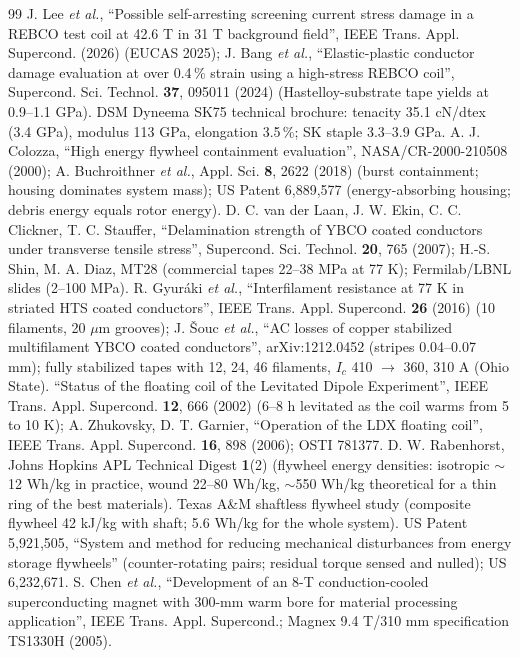 \begin{thebibliography}{99}
 J. Lee \emph{et al.}, ``Possible self-arresting screening current stress damage in a REBCO test coil at 42.6 T in 31 T background field'', IEEE Trans. Appl. Supercond. (2026) (EUCAS 2025); J. Bang \emph{et al.}, ``Elastic-plastic conductor damage evaluation at over 0.4\,\% strain using a high-stress REBCO coil'', Supercond. Sci. Technol. \textbf{37}, 095011 (2024) (Hastelloy-substrate tape yields at 0.9--1.1 GPa).
 DSM Dyneema SK75 technical brochure: tenacity 35.1 cN/dtex (3.4 GPa), modulus 113 GPa, elongation 3.5\,\%; SK staple 3.3--3.9 GPa.
 A. J. Colozza, ``High energy flywheel containment evaluation'', NASA/CR-2000-210508 (2000); A. Buchroithner \emph{et al.}, Appl. Sci. \textbf{8}, 2622 (2018) (burst containment; housing dominates system mass); US Patent 6,889,577 (energy-absorbing housing; debris energy equals rotor energy).
 D. C. van der Laan, J. W. Ekin, C. C. Clickner, T. C. Stauffer, ``Delamination strength of YBCO coated conductors under transverse tensile stress'', Supercond. Sci. Technol. \textbf{20}, 765 (2007); H.-S. Shin, M. A. Diaz, MT28 (commercial tapes 22--38 MPa at 77 K); Fermilab/LBNL slides (2--100 MPa).
 R. Gyur\'aki \emph{et al.}, ``Interfilament resistance at 77 K in striated HTS coated conductors'', IEEE Trans. Appl. Supercond. \textbf{26} (2016) (10 filaments, 20 $\mu$m grooves); J. \v{S}ouc \emph{et al.}, ``AC losses of copper stabilized multifilament YBCO coated conductors'', arXiv:1212.0452 (stripes 0.04--0.07 mm); fully stabilized tapes with 12, 24, 46 filaments, $I_c$ 410 $\to$ 360, 310 A (Ohio State).
 ``Status of the floating coil of the Levitated Dipole Experiment'', IEEE Trans. Appl. Supercond. \textbf{12}, 666 (2002) (6--8 h levitated as the coil warms from 5 to 10 K); A. Zhukovsky, D. T. Garnier, ``Operation of the LDX floating coil'', IEEE Trans. Appl. Supercond. \textbf{16}, 898 (2006); OSTI 781377.
 D. W. Rabenhorst, Johns Hopkins APL Technical Digest \textbf{1}(2) (flywheel energy densities: isotropic $\sim$12 Wh/kg in practice, wound 22--80 Wh/kg, $\sim$550 Wh/kg theoretical for a thin ring of the best materials).
 Texas A\&M shaftless flywheel study (composite flywheel 42 kJ/kg with shaft; 5.6 Wh/kg for the whole system).
 US Patent 5,921,505, ``System and method for reducing mechanical disturbances from energy storage flywheels'' (counter-rotating pairs; residual torque sensed and nulled); US 6,232,671.
 S. Chen \emph{et al.}, ``Development of an 8-T conduction-cooled superconducting magnet with 300-mm warm bore for material processing application'', IEEE Trans. Appl. Supercond.; Magnex 9.4 T/310 mm specification TS1330H (2005).

\end{thebibliography}
